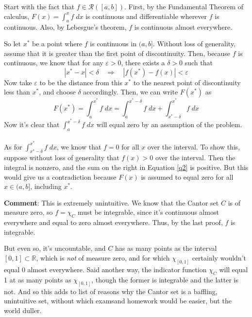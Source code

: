 \documentclass[12pt]{article}
\theoremstyle{plain}
\theoremstyle{definition}
\theoremstyle{remark}
\begin{document}
\begin{enumerate}
Start with the fact that $f\in\mathscr{R}([a,b])$. First, by the Fundamental Theorem of calculus, $F(x)=\int^x_a f\;dx$ is continuous and differentiable wherever $f$ is continuous. Also, by Lebesgue's theorem, $f$ is continuous almost everywhere. 

So let $x^*$ be a point where $f$ is continuous in $(a,b]$. Without loss of generality, assume that it is greater than the first point of discontinuity. Then, because $f$ is continuous, we know that for any $\varepsilon>0$, there exists a $\delta>0$ such that 
\[
    |x^*-x|<\delta \quad \Rightarrow \quad |f(x^*)-f(x)|<\varepsilon
\]
\newpage
Now take $\varepsilon$ to be the distance from this $x^*$ to the nearest point of discontinuity less than $x^*$, and choose $\delta$ accordingly. Then, we can write $F(x^*)$ as 
\begin{equation}
    \label{q2}
    F(x^*) = \int^{x^*}_a f\;dx = 
    \int^{x^* - \delta}_a f\;dx +
    \int^{x^*}_{x^* - \delta} f\;dx
\end{equation}
Now it's clear that $\int^{x^* - \delta}_a f\;dx$ will equal zero by an assumption of the problem. 
\\
\\
As for $\int^{x^*}_{x^* - \delta} f\;dx$, we know that $f=0$ for all $x$ over the interval. To show this, suppose without loss of generality that $f(x)>0$ over the interval. Then the integral is nonzero, and the sum on the right in Equation \ref{q2} is positive. But this would give us a contradiction because $F(x)$ is assumed to equal zero for all $x\in(a,b]$, including $x^*$.

\textbf{Comment}: This is extremely unintuitive. We know that the Cantor set $C$ is of measure zero, so $f=\chi_C$ must be integrable, since it's continuous almost everywhere and equal to zero almost everywhere. Thus, by the last proof, $f$ is integrable. 

But even so, it's uncountable, and $C$ has as many points as the interval $[0,1]\subset\mathbb{R}$, which is \emph{not} of measure zero, and for which $\chi_{[0,1]}$ certainly wouldn't equal 0 almost everywhere.  Said another way, the indicator function $\chi_{C}$ will equal 1 at as many points as $\chi_{[0,1]}$, though the former is integrable and the latter is not.  And so this adds to list of reasons why the Cantor set is a baffling, unintuitive set, without which examsand homework would be easier, but the world duller.
    

\end{enumerate}
\end{document}
